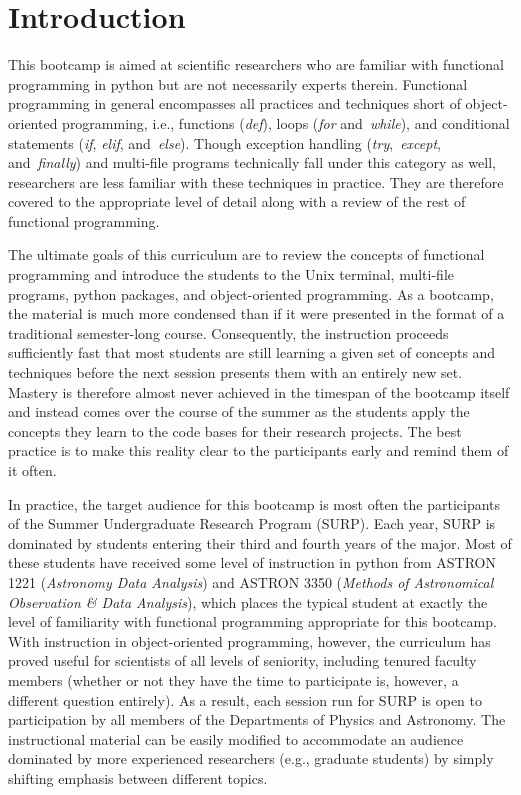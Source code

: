 
\section{Introduction}
\label{sec:intro}
\noindent
This bootcamp is aimed at scientific researchers who are familiar with
functional programming in python but are not necessarily experts therein.
Functional programming in general encompasses all practices and techniques
short of object-oriented programming, i.e., functions (\textit{def}), loops
(\textit{for} and~\textit{while}), and conditional statements (\textit{if},
\textit{elif}, and~\textit{else}).
Though exception handling (\textit{try},~\textit{except}, and~\textit{finally})
and multi-file programs technically fall under this category as well,
researchers are less familiar with these techniques in practice.
They are therefore covered to the appropriate level of detail along with a
review of the rest of functional programming.
\par
The ultimate goals of this curriculum are to review the concepts of functional
programming and introduce the students to the Unix terminal, multi-file
programs, python packages, and object-oriented programming.
As a bootcamp, the material is much more condensed than if it were presented in
the format of a traditional semester-long course.
Consequently, the instruction proceeds sufficiently fast that most students are
still learning a given set of concepts and techniques before the next session
presents them with an entirely new set.
Mastery is therefore almost never achieved in the timespan of the bootcamp
itself and instead comes over the course of the summer as the students apply
the concepts they learn to the code bases for their research projects.
The best practice is to make this reality clear to the participants early and
remind them of it often.
\par
In practice, the target audience for this bootcamp is most often the
participants of the Summer Undergraduate Research Program (SURP).
Each year, SURP is dominated by students entering their third and fourth years
of the major.
Most of these students have received some level of instruction in python from
ASTRON 1221 (\textit{Astronomy Data Analysis}) and ASTRON 3350 (\textit{Methods
of Astronomical Observation \& Data Analysis}), which places the typical
student at exactly the level of familiarity with functional programming
appropriate for this bootcamp.
With instruction in object-oriented programming, however, the curriculum has
proved useful for scientists of all levels of seniority, including tenured
faculty members (whether or not they have the time to participate is, however,
a different question entirely).
As a result, each session run for SURP is open to participation by all members
of the Departments of Physics and Astronomy.
The instructional material can be easily modified to accommodate an audience
dominated by more experienced researchers (e.g., graduate students) by simply
shifting emphasis between different topics.

